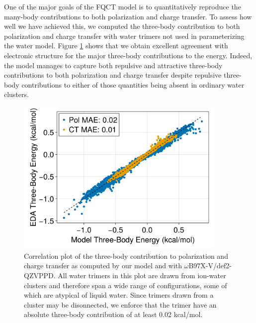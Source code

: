 \documentclass[journal=jctcce,manuscript=article]{achemso}
\begin{document}
One of the major goals of the FQCT model is to quantitatively reproduce the many-body contributions to both polarization and charge transfer. To assess how well we have achieved this, we computed the three-body contribution to both polarization and charge transfer with water trimers not used in parameterizing the water model. %
Figure \ref{fig:pol_ct_water} shows that we obtain excellent agreement with electronic structure for the major three-body contributions to the energy. Indeed, the model manages to capture both repulsive and attractive three-body contributions to both polarization and charge transfer despite repulsive three-body contributions to either of those quantities being absent in ordinary water clusters.\cite{heindel2020many} %
\begin{figure}[h]
  \includegraphics*[width=0.9\textwidth]{figures/three_body_pol_and_ct_water.png}
  \caption{Correlation plot of the three-body contribution to polarization and
  charge transfer as computed by our model and with $\omega$B97X-V/def2-QZVPPD.
  All water trimers in this plot are drawn from ion-water clusters and therefore
  span a wide range of configurations, some of which are atypical of liquid water.
  Since trimers drawn from a cluster may be disonnected, we enforce that the trimer
  have an absolute three-body contribution of at least 0.02 kcal/mol.
}
  \label{fig:pol_ct_water}
\end{figure}
\end{document}
